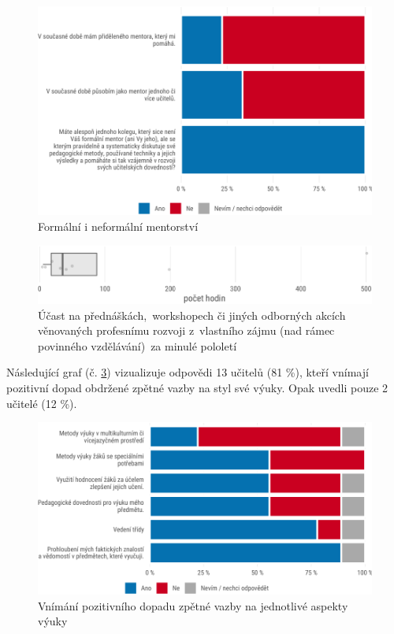 \documentclass[12pt,a4paper,]{report}
\begin{document}
\begin{figure}

{\centering \includegraphics[width=\textwidth]{figs/mentoring-1}

}

\caption{Formální i neformální mentorství}\label{fig:mentoring}
\end{figure}

\begin{figure}

{\centering \includegraphics[width=\textwidth]{figs/profDevelop-1}

}

\caption{Účast na přednáškách, workshopech či jiných odborných akcích věnovaných profesnímu rozvoji z vlastního zájmu (nad rámec povinného vzdělávání) za minulé pololetí}\label{fig:profDevelop}
\end{figure}

\newpage

Následující graf (č. \ref{fig:feedback}) vizualizuje odpovědi 13 učitelů (81 \%), kteří vnímají pozitivní dopad obdržené zpětné vazby na styl své výuky. Opak uvedli pouze 2 učitelé (12 \%).

\begin{figure}

{\centering \includegraphics[width=\textwidth]{figs/feedback-1}

}

\caption{Vnímání pozitivního dopadu zpětné vazby na jednotlivé aspekty výuky}\label{fig:feedback}
\end{figure}
\end{document}
